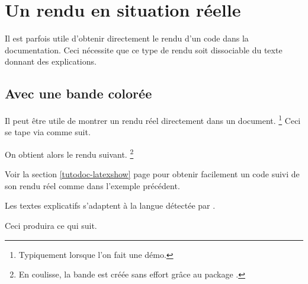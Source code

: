 \documentclass{../main/main}
\begin{document}
\section{Un rendu en situation réelle}
\label{tutodoc-showcase}

Il est parfois utile d'obtenir directement le rendu d'un code dans la documentation. Ceci nécessite que ce type de rendu soit dissociable du texte donnant des explications.



\subsection{Avec une bande colorée}

\begin{tdocexa}
    Il peut être utile de montrer un rendu réel directement dans un document.
    \footnote{
        Typiquement lorsque l'on fait une démo.
    }
    Ceci se tape via  comme suit.


    On obtient alors le rendu suivant.
    \footnote{
        En coulisse, la bande est créée sans effort grâce au package .
    }

    \medskip

    
\end{tdocexa}


\begin{tdocrem}
    Voir la section \ref{tutodoc-latexshow} page \pageref{tutodoc-latexshow} pour obtenir facilement un code suivi de son rendu réel comme dans l'exemple précédent.
\end{tdocrem}


\begin{tdocnote}
    Les textes explicatifs s'adaptent à la langue détectée par \thisproj.
\end{tdocnote}


\begin{tdocexa}
    \leavevmode


    Ceci produira ce qui suit.

    \medskip

    
\end{tdocexa}
\end{document}
